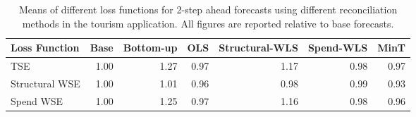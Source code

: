 \begin{table}[ht]
\centering
\begin{tabular}{lrrrrrr}
  \hline
Loss Function & Base & Bottom-up & OLS & Structural-WLS & Spend-WLS & MinT \\ 
  \hline
TSE & 1.00 & 1.27 & 0.97 & 1.17 & 0.98 & 0.97 \\ 
  Structural WSE & 1.00 & 1.01 & 0.96 & 0.98 & 0.99 & 0.93 \\ 
  Spend WSE & 1.00 & 1.25 & 0.97 & 1.16 & 0.98 & 0.96 \\ 
   \hline
\end{tabular}
\caption{Means of different loss functions for 2-step ahead forecasts using different reconciliation methods in the tourism application.  All figures are reported relative to base forecasts.} 
\end{table}
